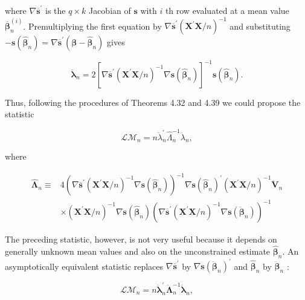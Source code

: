 \documentclass[10pt]{article}
\begin{document}
where $\nabla \overline{\mathbf{s}}^{\prime}$ is the $q \times k$ Jacobian of $\mathbf{s}$ with $i$ th row evaluated at a mean value $\overline{\boldsymbol{\beta}}_{n}^{(i)}$. Premultiplying the first equation by $\nabla \overline{\mathbf{s}}^{\prime}\left(\mathbf{X}^{\prime} \mathbf{X} / n\right)^{-1}$ and substituting $-\mathbf{s}\left(\hat{\boldsymbol{\beta}}_{n}\right)=\nabla \overline{\mathbf{s}}^{\prime}\left(\boldsymbol{\beta}-\hat{\boldsymbol{\beta}}_{n}\right)$ gives

$$
\ddot{\boldsymbol{\lambda}}_{n}=2\left[\nabla \overline{\mathbf{s}}^{\prime}\left(\mathbf{X}^{\prime} \mathbf{X} / n\right)^{-1} \nabla \mathbf{s}\left(\hat{\boldsymbol{\beta}}_{n}\right)\right]^{-1} \mathbf{s}\left(\hat{\boldsymbol{\beta}}_{n}\right) .
$$

Thus, following the procedures of Theorems 4.32 and 4.39 we could propose the statistic

$$
\mathcal{L} \mathcal{M}_{n}=n \ddot{\lambda}_{n}^{\prime} \hat{\Lambda}_{n}^{-1} \ddot{\lambda}_{n},
$$

where

$$
\begin{aligned}
\hat{\boldsymbol{\Lambda}}_{n} \equiv & 4\left(\nabla \overline{\mathbf{s}}^{\prime}\left(\mathbf{X}^{\prime} \mathbf{X} / n\right)^{-1} \nabla \mathbf{s}\left(\hat{\boldsymbol{\beta}}_{n}\right)\right)^{-1} \nabla \mathbf{s}\left(\hat{\boldsymbol{\beta}}_{n}\right)^{\prime}\left(\mathbf{X}^{\prime} \mathbf{X} / n\right)^{-1} \ddot{\mathbf{V}}_{n} \\
& \times\left(\mathbf{X}^{\prime} \mathbf{X} / n\right)^{-1} \nabla \mathbf{s}\left(\hat{\boldsymbol{\beta}}_{n}\right)\left(\nabla \overline{\mathbf{s}}^{\prime}\left(\mathbf{X}^{\prime} \mathbf{X} / n\right)^{-1} \nabla \mathbf{s}\left(\ddot{\boldsymbol{\beta}}_{n}\right)\right)^{-1}
\end{aligned}
$$

The preceding statistic, however, is not very useful because it depends on generally unknown mean values and also on the unconstrained estimate $\hat{\boldsymbol{\beta}}_{n}$. An asymptotically equivalent statistic replaces $\nabla \overline{\mathbf{s}}^{\prime}$ by $\nabla \mathbf{s}\left(\ddot{\boldsymbol{\beta}}_{n}\right)^{\prime}$ and $\hat{\boldsymbol{\beta}}_{n}$ by $\ddot{\boldsymbol{\beta}}_{n}$ :

$$
\mathcal{L} \mathcal{M}_{n}=n \ddot{\boldsymbol{\lambda}}_{n}^{\prime} \ddot{\boldsymbol{\Lambda}}_{n}^{-1} \ddot{\boldsymbol{\lambda}}_{n},
$$
\end{document}
